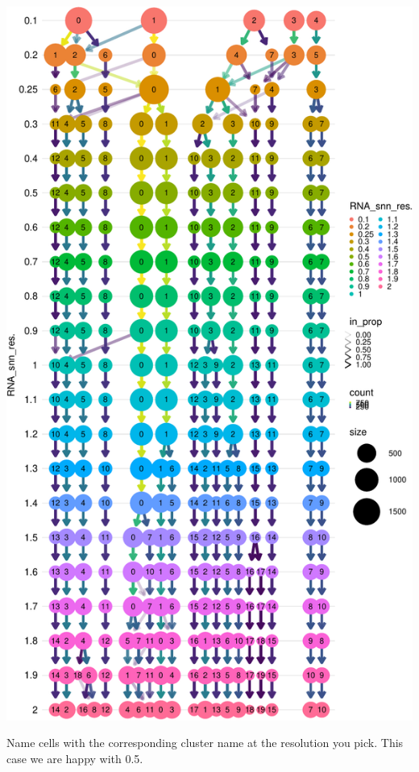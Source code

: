 \documentclass[
]{book}
\newenvironment{Shaded}{\begin{snugshade}}{\end{snugshade}}
\newcommand{\CommentTok}[1]{\textcolor[rgb]{0.56,0.35,0.01}{\textit{#1}}}
\newcommand{\FloatTok}[1]{\textcolor[rgb]{0.00,0.00,0.81}{#1}}
\newcommand{\FunctionTok}[1]{\textcolor[rgb]{0.13,0.29,0.53}{\textbf{#1}}}
\newcommand{\NormalTok}[1]{#1}
\newcommand{\OtherTok}[1]{\textcolor[rgb]{0.56,0.35,0.01}{#1}}
\newcommand{\SpecialCharTok}[1]{\textcolor[rgb]{0.81,0.36,0.00}{\textbf{#1}}}
\begin{document}
\includegraphics{scRNAseqInR_ABACBS_2024_Doco_files/figure-latex/unnamed-chunk-21-1.pdf}

Name cells with the corresponding cluster name at the resolution you pick. This case we are happy with 0.5.

\begin{Shaded}
\end{Shaded}
\end{document}
